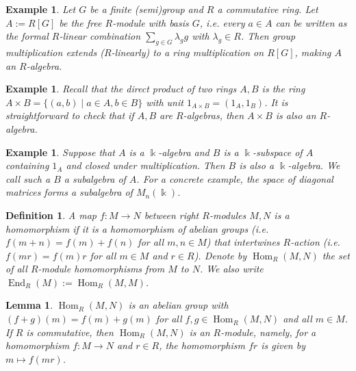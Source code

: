 \documentclass[11pt,a4paper]{article}
\makeatletter
\numberwithin{equation}{section}
\renewenvironment{proof}[1][\proofname]{\par
    \pushQED{\qed}%
    \normalfont \topsep0\p@\@plus6\p@ \labelsep1em\relax
    \trivlist
    \item[\hskip\labelsep\indent
        \bfseries #1]\ignorespaces
    \mbox{}
}{
    \popQED\endtrivlist\@endpefalse
}
\theoremstyle{all}
\newtheorem{lemma}[theorem]{Lemma}
\newtheorem{example}[theorem]{Example}
\newtheorem{definition}[theorem]{Definition}
\theoremstyle{remark}
\newcommand{\Hom}{\operatorname{Hom}\nolimits}
\newcommand{\End}{\operatorname{End}\nolimits}
\newcommand{\defn}[1]{\textsl{\color{darkblue} #1}}
\makeatother
\begin{document}
\begin{example}
Let $G$ be a finite (semi)group and $R$ a commutative ring.
Let $A:=R[G]$ be the free $R$-module with basis $G$, i.e. every $a\in A$ can be written as the formal $R$-linear combination $\sum_{g\in G} \lambda_g g$ with $\lambda_g\in R$.
Then group multiplication extends ($R$-linearly) to a ring multiplication on $R[G]$, making $A$ an $R$-algebra.
\end{example}

\begin{example}
Recall that the \defn{direct product} of two rings $A,B$ is the ring $A\times B=\{(a,b)\mid a\in A, b\in B\}$ with unit $1_{A\times B}=(1_A,1_B)$.
It is straightforward to check that if $A,B$ are $R$-algebras, then $A\times B$ is also an $R$-algebra.
\end{example}

\begin{example}
Suppose that $A$ is a $\Bbbk$-algebra and $B$ is a $\Bbbk$-subspace of $A$ containing $1_A$ and closed under multiplication.  Then $B$ is also a $\Bbbk$-algebra.  We call such a $B$ a \defn{subalgebra} of $A$.  For a concrete example, the space of diagonal matrices forms a subalgebra of $M_n(\Bbbk)$.
\end{example}

\begin{definition}
A map $f:M\to N$ between right $R$-modules $M,N$ is a \defn{homomorphism} if it is a homomorphism of abelian groups (i.e. $f(m+n)=f(m)+f(n)$ for all $m,n\in M$) that intertwines $R$-action (i.e. $f(mr)=f(m)r$ for all $m\in  M$ and $r\in R$).
Denote by $\Hom_R(M,N)$ the set of all $R$-module homomorphisms from $M$ to $N$.
We also write $\End_R(M):=\Hom_R(M,M)$.
\end{definition}

\begin{lemma}
$\Hom_R(M,N)$ is an abelian group with $(f+g)(m)=f(m)+g(m)$ for all $f,g\in\Hom_R(M,N)$ and all $m\in M$.
If $R$ is commutative, then $\Hom_R(M,N)$ is an $R$-module, namely, for a homomorphism $f:M\to N$ and $r\in R$, the homomorphism $fr$ is given by $m\mapsto f(mr)$.
\end{lemma}
%
%
%
%
\end{document}
